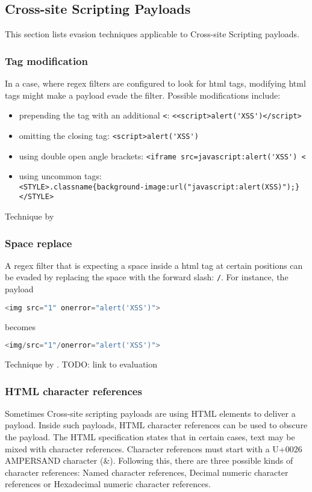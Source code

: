 \subsection{Cross-site Scripting Payloads}
\label{sec:xsstech}
This section lists evasion techniques applicable to Cross-site Scripting payloads.

\subsubsection{Tag modification}
In a case, where regex filters are configured to look for html tags, modifying html tags might make a payload evade the filter. Possible modifications include:
\begin{itemize}
	\item prepending the tag with an additional \verb|<|: \verb|<<script>alert('XSS')</script>|
	\item omitting the closing tag: \verb|<script>alert('XSS')|
	\item using double open angle brackets: \verb|<iframe src=javascript:alert('XSS') <|
	\item using uncommon tags: \\ \verb|<STYLE>.classname{background-image:url("javascript:alert(XSS)");}</STYLE>|
\end{itemize}
Technique by \cite{medium/allypetitt}

\subsubsection{Space replace}
A regex filter that is expecting a space inside a html tag at certain positions can be evaded by replacing the space with the forward slash: \verb|/|.
For instance, the payload

\begin{lstlisting}[style=basicStyle, language=Python]
<img src="1" onerror="alert('XSS')">
\end{lstlisting}

becomes

\begin{lstlisting}[style=basicStyle, language=Python]
<img/src="1"/onerror="alert('XSS')">
\end{lstlisting}

Technique by \cite{medium/allypetitt}. {\color{red}TODO: link to evaluation}

\subsubsection{HTML character references}
\label{sec:htmlcharreftech}
Sometimes Cross-site scripting payloads are using HTML elements to deliver a payload. Inside such payloads, HTML character references can be used to obscure the payload. The HTML specification states that in certain cases, text may be mixed with character references. Character references must start with a U+0026 AMPERSAND character (\&). Following this, there are three possible kinds of character references: Named character references, Decimal numeric character references or Hexadecimal numeric character references. \cite{www/html}

